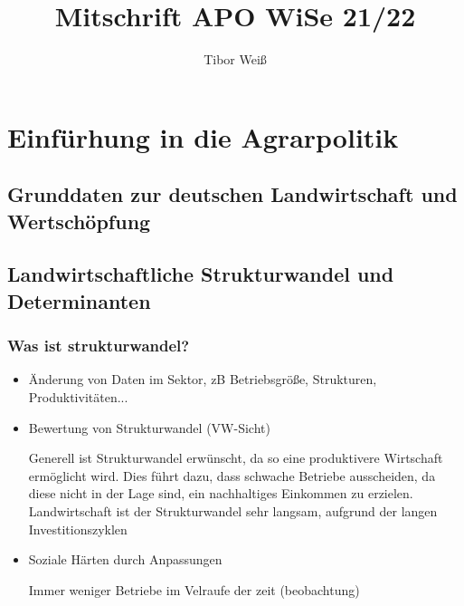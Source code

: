 \documentclass[11pt]{article}
\title{Mitschrift APO WiSe 21/22}
\author{Tibor Weiß}
\begin{document}
\maketitle
\section{Einfürhung in die Agrarpolitik}

\subsection{Grunddaten zur deutschen Land\-wirt\-schaft und Wert\-schöpf\-ung}


\subsection{Landwirtschaftliche Strukturwandel und Determinanten}

\subsubsection{Was ist strukturwandel?}
\begin{itemize}
	\item{Änderung von Daten im Sektor, zB Betriebsgröße, Strukturen, Produktivitäten...}
	\item{Bewertung von Strukturwandel (VW-Sicht)}

		Generell ist Strukturwandel erwünscht, da so eine produktivere Wirtschaft ermöglicht wird. Dies führt dazu, dass \glqq schwache\grqq{}  Betriebe ausscheiden, da diese nicht in der Lage sind, ein nachhaltiges Einkommen zu erzielen.
Landwirtschaft ist der Strukturwandel sehr langsam, aufgrund der langen Investitionszyklen
	\item{Soziale Härten durch Anpassungen}

Immer weniger Betriebe im Velraufe der zeit (beobachtung)

\end{itemize}
\end{document}
